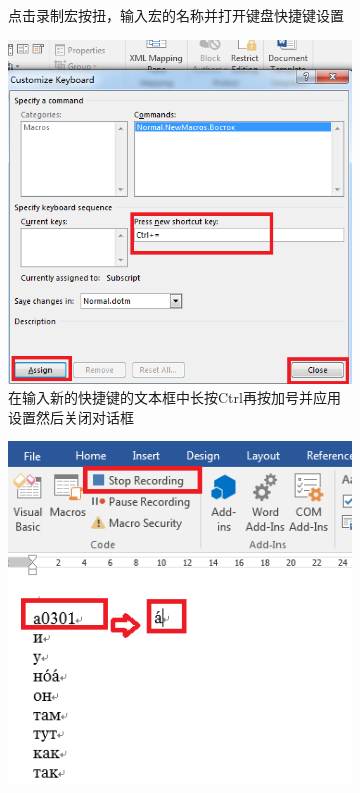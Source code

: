 \documentclass[10.5pt]{ctexart}
\begin{document}
\begin{enumerate}
\begin{figure}[!ht]
\begin{subfigure}[b]{0.4\textwidth}
        \caption{点击录制宏按扭，输入宏的名称并打开键盘快捷键设置}
\end{subfigure}\qquad	
\begin{subfigure}[b]{0.4\textwidth}
        \includegraphics[width=\textwidth]{figure10.png}
        \caption{在输入新的快捷键的文本框中长按Ctrl再按加号并应用设置然后关闭对话框}
\end{subfigure}
\begin{subfigure}[b]{0.4\textwidth}
        \includegraphics[width=\textwidth]{figure11.png}

\end{subfigure}
\end{figure}
\end{enumerate}
\end{document}
